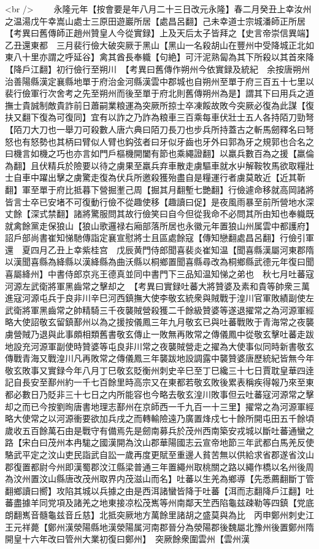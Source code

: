 <br />
　　永隆元年【按會要是年八月二十三日改元永隆】春二月癸丑上幸汝州之温湯戊午幸嵩山處士三原田遊巖所居【處昌呂翻】己未幸道士宗城潘師正所居　【考異曰舊傳師正趙州贊皇人今從實録】上及天后太子皆拜之【史言帝崇信異端】乙丑還東都　三月裴行儉大破突厥于黑山【黑山一名殺胡山在豐州中受降城正北如東八十里亦謂之呼延谷】禽其酋長奉軄【句絶】可汗泥熟匐為其下所殺以其首來降【降戶江翻】初行儉行至朔川　【考異曰舊傳作朔州今依實録及統紀　余按唐朔州治善陽縣漢定襄縣地單于府治金河縣漢雲中郡城也自朔州至單于府三百五十七里以裴行儉軍行次舍考之先至朔州而後至單于府北則舊傳朔州為是】謂其下曰用兵之道撫士貴誠制敵貴詐前日蕭嗣業粮運為突厥所掠士卒凍餒故敗今突厥必復為此謀【復扶又翻下復為可復同】宜有以詐之乃詐為粮車三百乘每車伏壯士五人各持陌刀勁弩【陌刀大刀也一舉刀可殺數人唐六典曰陌刀長刀也步兵所持蓋古之斬馬劒釋名曰弩怒也有怒勢也其柄曰臂似人臂也鈎弦者曰牙似牙齒也牙外曰郭為牙之規郭也合名之曰機言如機之巧也亦言如門戶樞機開闔有節也乘繩證翻】以羸兵數百為之援【羸倫為翻】且伏精兵於險要以待之虜果至羸兵弃車散走虜驅車就水屮解鞍牧馬欲取糧壯士自車中躍出擊之虜驚走復為伏兵所邀殺獲殆盡自是糧運行者虜莫敢近【近其靳翻】軍至單于府比抵暮下營掘壍己周【掘其月翻塹七艷翻】行儉遽命移就高岡諸將皆言士卒已安堵不可復動行儉不從趣使移【趣讀曰促】是夜風雨暴至前所營地水深丈餘【深式禁翻】諸將驚服問其故行儉笑曰自今但從我命不必問其所由知也奉軄既就禽餘黨走保狼山【狼山歌邏禄右廂部落所居也永徽元年置狼山州属雲中都護府】詔戶部尚書崔知悌馳傳詣定襄宣慰將士且區處餘寇【傳知戀翻處昌呂翻】行儉引軍還　夏四月乙丑上幸紫桂宫　戊辰黄門侍郎聞喜裴炎崔知温【聞喜縣漢屬河東郡隋以漢聞喜縣為絳縣以漢絳縣為曲沃縣以桐鄉置聞喜縣尋改為桐鄉縣武德元年復曰聞喜屬絳州】中書侍郎京兆王德真並同中書門下三品知温知悌之弟也　秋七月吐蕃寇河源左武衛將軍黑齒常之擊却之　【考異曰實録吐蕃大將贊婆及素和貴等帥衆三萬進寇河源屯兵于良非川辛巳河西鎮撫大使李敬玄統衆與賊戰于湟川官軍敗績副使左武衛將軍黑齒常之帥精騎三千夜襲賊營殺獲二千餘級贊婆等遂退擢常之為河源軍經略大使詔敬玄留鎮鄯州以為之援按儀鳳三年九月敬玄已與吐蕃戰敗于青海常之夜襲虜營賊乃退與此事頗相類舊書敬玄傳止一敗無再敗常之傳儀鳳中從敬玄擊吐蕃走跋地設充河源軍副使時贊婆等屯良非川常之夜襲賊營走之擢為大使事似同時新書敬玄傳戰青海又戰湟川凡再敗常之傳儀鳳三年襲跋地設調露中襲贊婆唐歷統紀皆無今年敬玄敗事又實録今年八月丁巳敬玄貶衡州刺史辛巳至丁巳纔三十七日賈耽皇華四逹記自長安至鄯州約一千七百餘里時高宗又在東都若敬玄敗後累表稱疾得報乃來至東都必數日乃貶非三十七日之内所能容也今略去敬玄湟川敗事但云吐蕃寇河源常之擊却之而已今按劉㫬唐書地理志鄯州在京師西一千九百一十三里】擢常之為河源軍經略大使常之以河源衝要欲加兵戌之而轉輸險遠乃廣置烽戍七十餘所開屯田五千餘頃歲收五百餘萬石由是戰守有備焉先是劒南募兵於茂州西南築安戎城以斷吐蕃通蠻之路【宋白曰茂州本冉駹之國漢開為汶山郡華陽國志云宣帝地節三年武都白馬羌反使駱武平定之汶山吏民詣武自訟一歲再度更賦至重邊人貧苦無以供給求省郡遂省汶山郡復置都尉今州即漢蜀郡汶江縣梁普通三年置繩州取桃關之路以繩作橋以名州後周為汶州置汶山縣唐改茂州取界内茂滋山而名】吐蕃以生羌為鄉導【先悉薦翻斷丁管翻鄉讀曰嚮】攻陷其城以兵據之由是西洱諸蠻皆降于吐蕃【洱而志翻降戶江翻】吐蕃盡據羊同党項及諸羌之地東接凉松茂嶲等州南鄰天笁西陷龜兹疎勒等四鎮【党底朗翻嶲音髓龜兹音丘慈】北抵突厥地方萬餘里諸胡之盛莫與為比　丙申鄭州刺史江王元祥薨【鄭州漢滎陽縣地漢滎陽属河南郡晉分為滎陽郡後魏屬北豫州後置鄭州隋開皇十六年改曰管州大業初復曰鄭州】　突厥餘衆圍雲州【雲州漢